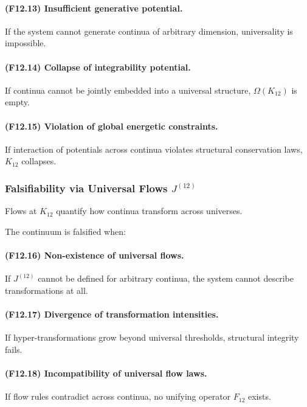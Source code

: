 \paragraph{(F12.13) Insufficient generative potential.}
If the system cannot generate continua of arbitrary dimension,
universality is impossible.

\paragraph{(F12.14) Collapse of integrability potential.}
If continua cannot be jointly embedded into a universal structure,
$\Omega(K_{12})$ is empty.

\paragraph{(F12.15) Violation of global energetic constraints.}
If interaction of potentials across continua violates structural
conservation laws, $K_{12}$ collapses.



\subsubsection{Falsifiability via Universal Flows $J^{(12)}$}

Flows at $K_{12}$ quantify how continua transform across universes.

The continuum is falsified when:

\paragraph{(F12.16) Non-existence of universal flows.}
If $J^{(12)}$ cannot be defined for arbitrary continua,
the system cannot describe transformations at all.

\paragraph{(F12.17) Divergence of transformation intensities.}
If hyper-transformations grow beyond universal thresholds,
structural integrity fails.

\paragraph{(F12.18) Incompatibility of universal flow laws.}
If flow rules contradict across continua,
no unifying operator $F_{12}$ exists.

